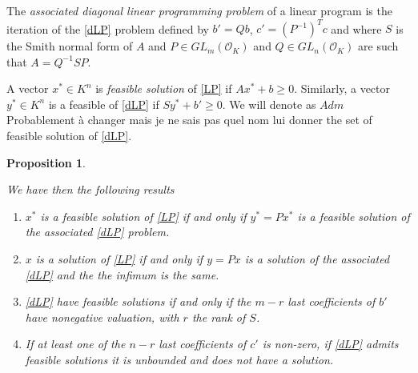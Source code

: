 \documentclass[a4paper,12pt]{article}
\newtheorem{proposition}{Proposition}
\newcommand{\corentin}[1]{{\color{red} #1}} %
\newcommand{\OK}{\mathcal{O}_K}
\begin{document}
The \emph{associated diagonal linear programming problem} of a linear program is the iteration of the \ref{dLP} problem defined by $b' = Qb$, $c' = \left(P^{-1}\right)^T c$ and where $S$ is the Smith normal form of $A$ and $P \in GL_m(\OK)$ and $ Q \in GL_n(\OK)$ are such that $A = Q^{-1} S P$.

A vector $x^* \in K^n$ is \emph{feasible solution} of \ref{LP} if $Ax^* + b \geq 0$. Similarly, a vector $y^* \in K^n$ is a feasible of \ref{dLP} if $Sy^*+b' \geq 0$. We will denote as $Adm$ \corentin{Probablement à changer mais je ne sais pas quel nom lui donner} the set of feasible solution of \ref{dLP}.

\begin{proposition}\label{prop:reduc}
	
	We have then the following results
	\begin{enumerate}
		\item $x^*$ is a feasible solution of \ref{LP} if and only if $y^* = P x^*$ is a feasible solution of the associated \ref{dLP} problem.
		\item $x$ is a solution of \ref{LP} if and only if $y = P x$ is a solution of the associated \ref{dLP} and the the infimum is the same.
		\item \ref{dLP} have feasible solutions if and only if the $m-r$ last coefficients of $b'$ have nonegative valuation, with $r$ the rank of $S$.
		\item If at least one of the $n-r$ last coefficients of $c'$ is non-zero, if \ref{dLP} admits feasible solutions it is unbounded and does not have a solution.
		 
  \end{enumerate}
\end{proposition}
	
\end{document}
